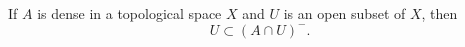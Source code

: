 If $A$ is dense in a topological space $X$ and $U$ is an open subset of $X$, then
$$U \subset (A \cap U)^-.$$

